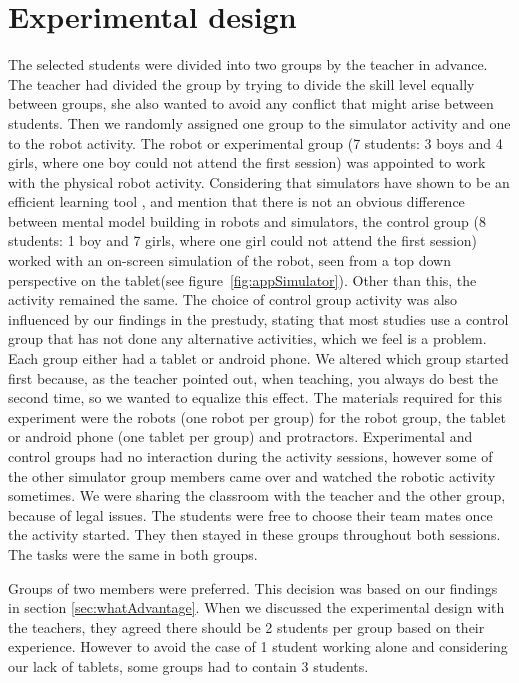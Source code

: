 \chapter{Experimental design}
The selected students were divided into two groups by the teacher in advance. The teacher had divided the group by trying to divide the skill level equally between groups, she also wanted to avoid any conflict that might arise between students. Then we randomly assigned one group to the simulator activity and one to the robot activity. The robot or experimental group (7 students: 3 boys and 4 girls, where one boy could not attend the first session) was appointed to work with the physical robot activity. Considering that simulators have shown to be an efficient learning tool \cite{mitnik2009collaborative}, and  mention that there is not an obvious difference between mental model building in robots and simulators, the control group (8 students: 1 boy and 7 girls, where one girl could not attend the first session) worked with an on-screen simulation of the robot, seen from a top down perspective on the tablet(see figure~\ref{fig:appSimulator}). Other than this, the activity remained the same. The choice of control group activity was also influenced by our findings in the prestudy, stating that most studies use a control group that has not done any alternative activities, which we feel is a problem. Each group either had a tablet or android phone. We altered which group started first because, as the teacher pointed out, when teaching, you always do best the second time, so we wanted to equalize this effect. The materials required for this experiment were the robots (one robot per group) for the robot group, the tablet or android phone (one tablet per group) and protractors. Experimental and control groups had no interaction during the activity sessions, however some of the other simulator group members came over and watched the robotic activity sometimes. We were sharing the classroom with the teacher and the other group, because of legal issues. The students were free to choose their team mates once the activity started. They then stayed in these groups throughout both sessions. The tasks were the same in both groups.

\bigskip\noindent
Groups of two members were preferred. This decision was based on our findings in section \ref{sec:whatAdvantage}. When we discussed the experimental design with the teachers, they agreed there should be 2 students per group based on their experience. However to avoid the case of 1 student working alone and considering our lack of tablets, some groups had to contain 3 students.
